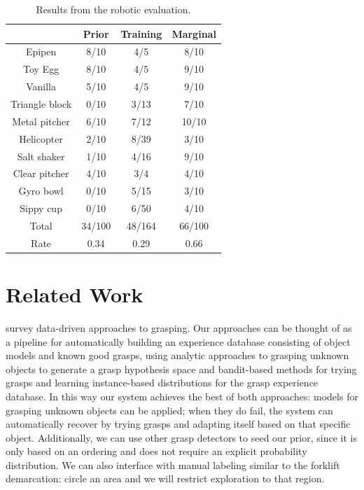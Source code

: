 \documentclass{article}
\begin{document}
\begin{table}
\begin{tabular}{cccc}
\toprule
                & Prior         &  Training     & Marginal\\
\midrule
Epipen          & 8/10          &  4/5          & 8/10 \\
Toy Egg         & 8/10          &  4/5          & 9/10 \\
Vanilla         & 5/10          &  4/5          & 9/10 \\
Triangle block  & 0/10          &  3/13         & 7/10 \\
Metal pitcher   & 6/10          &  7/12         & 10/10\\
Helicopter      & 2/10          &  8/39         & 3/10 \\
Salt shaker     & 1/10          &  4/16         & 9/10 \\
Clear pitcher   & 4/10          &  3/4          & 4/10 \\
Gyro bowl       & 0/10          &  5/15         & 3/10 \\
Sippy cup       & 0/10          &  6/50         & 4/10 \\
\midrule
Total           & 34/100         & 48/164       & 66/100\\
Rate            & 0.34          &  0.29         & 0.66\\
\bottomrule
\end{tabular}
\caption{Results from the robotic evaluation.\label{table:robot_results}}
\end{table}


\section{Related Work}

\citet{bohg13} survey data-driven approaches to grasping.  Our
approaches can be thought of as a pipeline for automatically building
an experience database consisting of object models and known good
grasps, using analytic approaches to grasping unknown objects to
generate a grasp hypothesis space and bandit-based methods for trying
grasps and learning instance-based distributions for the grasp
experience database.  In this way our system achieves the best of both
approaches: models for grasping unknown objects can be applied; when
they do fail, the system can automatically recover by trying
grasps and adapting itself based on that specific object. Additionally, we
can use other grasp detectors to seed our prior, since it is only based
on an ordering and does not require an explicit probability distribution.
We can also interface with manual labeling similar to the forklift demarcation:
circle an area and we will restrict exploration to that region.
\end{document}

